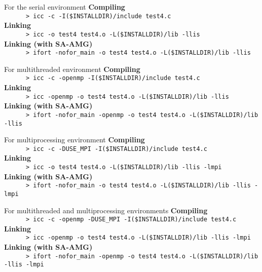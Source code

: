 \documentclass[a4paper]{article}
\begin{document}
\begin{itemsquarebox}[l]{For the serial environment}
\small
{\bf Compiling}\\
\verb+      > icc -c -I($INSTALLDIR)/include test4.c+\\
{\bf Linking}\\
\verb+      > icc -o test4 test4.o -L($INSTALLDIR)/lib -llis+\\
{\bf Linking (with SA-AMG)}\\
\verb+      > ifort -nofor_main -o test4 test4.o -L($INSTALLDIR)/lib -llis+
\end{itemsquarebox}
\begin{itemsquarebox}[l]{For multithreaded environment}
\small
{\bf Compiling}\\
\verb+      > icc -c -openmp -I($INSTALLDIR)/include test4.c+\\
{\bf Linking}\\
\verb+      > icc -openmp -o test4 test4.o -L($INSTALLDIR)/lib -llis+\\
{\bf Linking (with SA-AMG)}\\
\verb+      > ifort -nofor_main -openmp -o test4 test4.o -L($INSTALLDIR)/lib -llis+
\end{itemsquarebox}
\begin{itemsquarebox}[l]{For multiprocessing environment}
\small
{\bf Compiling}\\
\verb+      > icc -c -DUSE_MPI -I($INSTALLDIR)/include test4.c+\\
{\bf Linking}\\
\verb+      > icc -o test4 test4.o -L($INSTALLDIR)/lib -llis -lmpi+\\
{\bf Linking (with SA-AMG)}\\
\verb+      > ifort -nofor_main -o test4 test4.o -L($INSTALLDIR)/lib -llis -lmpi+
\end{itemsquarebox}
\begin{itemsquarebox}[l]{For multithreaded and multiprocessing environments}
\small
{\bf Compiling}\\
\verb+      > icc -c -openmp -DUSE_MPI -I($INSTALLDIR)/include test4.c+\\
{\bf Linking}\\
\verb+      > icc -openmp -o test4 test4.o -L($INSTALLDIR)/lib -llis -lmpi+\\
{\bf Linking (with SA-AMG)}\\
\verb+      > ifort -nofor_main -openmp -o test4 test4.o -L($INSTALLDIR)/lib -llis -lmpi+
\end{itemsquarebox}
\end{document}
